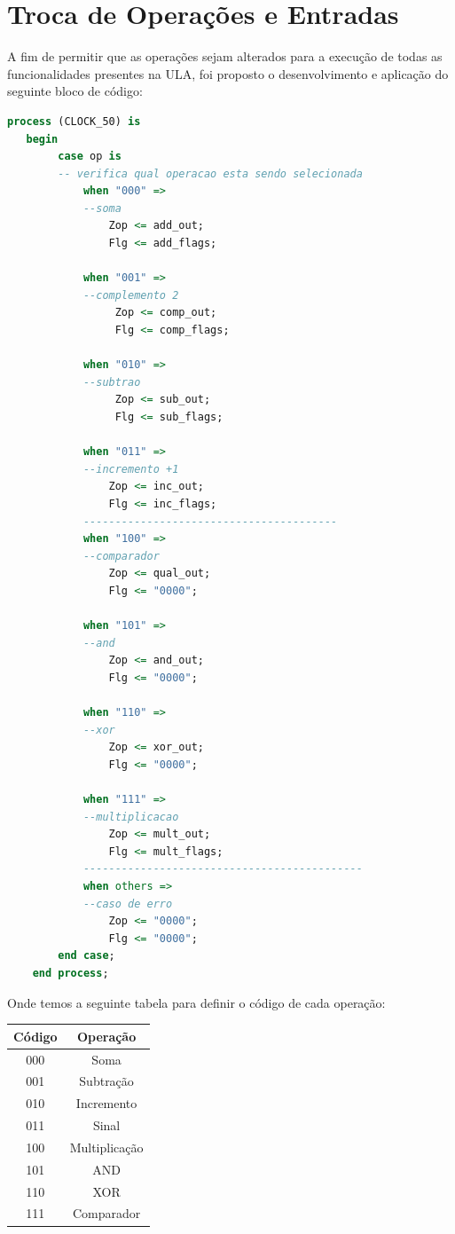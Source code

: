 \documentclass[a4paper, 12pt]{article}
\begin{document}
\section{Troca de Operações e Entradas}
A fim de permitir que as operações sejam alterados para a execução de todas as funcionalidades presentes na ULA, foi proposto o desenvolvimento e aplicação do seguinte bloco de código:
\begin{lstlisting}[language=VHDL]
process (CLOCK_50) is
   begin
		case op is
		-- verifica qual operacao esta sendo selecionada
			when "000" => 
			--soma
				Zop <= add_out;
				Flg <= add_flags;

			when "001" =>
			--complemento 2
				 Zop <= comp_out;
				 Flg <= comp_flags;

			when "010" =>
			--subtrao
				 Zop <= sub_out;
				 Flg <= sub_flags;

			when "011" =>
			--incremento +1
				Zop <= inc_out;
				Flg <= inc_flags;
			----------------------------------------
			when "100" =>
			--comparador
				Zop <= qual_out;
				Flg <= "0000";

			when "101" =>
			--and
				Zop <= and_out;
				Flg <= "0000";

			when "110" =>
			--xor
				Zop <= xor_out;
				Flg <= "0000";

			when "111" =>
			--multiplicacao
				Zop <= mult_out;
				Flg <= mult_flags;
			--------------------------------------------
			when others =>
			--caso de erro
				Zop <= "0000";
				Flg <= "0000";
        end case;
    end process;
\end{lstlisting}

Onde temos a seguinte tabela para definir o código de cada operação:

\begin{table}[htb]
\centering
\begin{tabular}{c|c}
Código & Operação \\ \hline \hline
000	& Soma 		\\\hline
001 & Subtração	\\\hline
010 & Incremento \\\hline
011 & Sinal \\\hline
100 & Multiplicação \\\hline
101 & AND \\\hline
110 & XOR \\\hline
111 & Comparador
\end{tabular}
\label{vazio}
\end{table}
\end{document}
